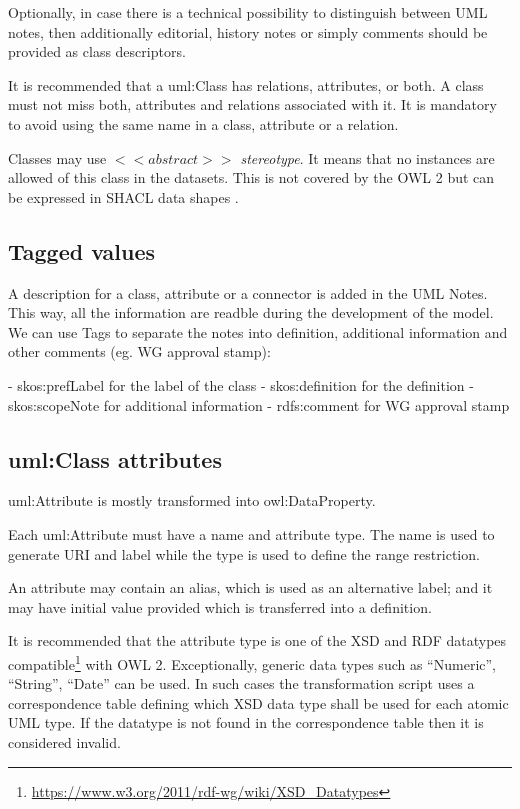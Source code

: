 	Optionally, in case there is a technical possibility to distinguish between UML notes, then additionally editorial, history notes or simply comments should be provided as class descriptors.

	It is recommended that a uml:Class has relations, attributes, or both. A class must not miss both, attributes and relations associated with it. 
	It is mandatory to avoid using the same name in a class, attribute or a relation. 
	
	Classes may use\textit{ $<<abstract>>$ stereotype}. It means that no instances are allowed of this class in the datasets. This is not covered by the OWL 2 \cite{owl2} but can be expressed in SHACL data shapes \cite{shacl-spec}. 

	\subsection{Tagged values}
	\label{sec:tagged-values}

	A description for a class, attribute or a connector is added in the UML Notes. This way, all the information are readble during the development of the model.
	We can use Tags to separate the notes into definition, additional information and other comments (eg. WG approval stamp):

		- skos:prefLabel for the label of the class
		- skos:definition for the definition
		- skos:scopeNote for additional information
		- rdfs:comment for WG approval stamp


	\subsection{uml:Class attributes}
	\label{sec:attributes-class}

	uml:Attribute is mostly transformed into owl:DataProperty.
	
	Each uml:Attribute must have a name and attribute type. The name is used to generate URI and label while the type is used to define the range restriction. 

	An attribute may contain an alias, which is used as an alternative label; and it may have initial value provided which is transferred into a definition.

	It is recommended that the attribute type is one of the XSD and RDF datatypes compatible\footnote{\url{https://www.w3.org/2011/rdf-wg/wiki/XSD_Datatypes}} with OWL 2. Exceptionally, generic data types such as ``Numeric'', ``String'', ``Date'' can be used. In such cases the transformation script uses a correspondence table defining which XSD data type shall be used for each atomic UML type. If the datatype is not found in the correspondence table then it is considered invalid. 

